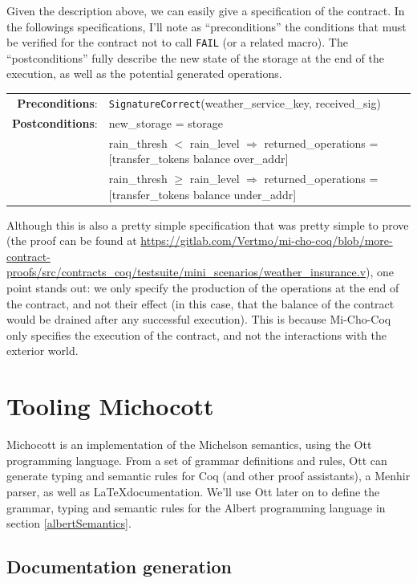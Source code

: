 \documentclass{report}
\begin{document}
Given the description above, we can easily give a specification of the contract. In the followings specifications, I'll note as ``preconditions'' the conditions that must be verified for the contract not to call \lstinline{FAIL} (or a related macro). The ``postconditions'' fully describe the new state of the storage at the end of the execution, as well as the potential generated operations.

{\small
\begin{longtable}{rl}
  \textbf{Preconditions}: & \texttt{SignatureCorrect}(weather\_service\_key, received\_sig)\\
  \textbf{Postconditions}: & new\_storage = storage\\
  & rain\_thresh $<$ rain\_level $\Rightarrow$ returned\_operations = [transfer\_tokens balance over\_addr]\\
  & rain\_thresh $\ge$ rain\_level $\Rightarrow$ returned\_operations = [transfer\_tokens balance under\_addr]\\
\end{longtable}}

Although this is also a pretty simple specification that was pretty simple to prove (the proof can be found at \url{https://gitlab.com/Vertmo/mi-cho-coq/blob/more-contract-proofs/src/contracts_coq/testsuite/mini_scenarios/weather_insurance.v}), one point stands out: we only specify the production of the operations at the end of the contract, and not their effect (in this case, that the balance of the contract would be drained after any successful execution). This is because Mi-Cho-Coq only specifies the execution of the contract, and not the interactions with the exterior world.

\section{Tooling Michocott}

Michocott is an implementation of the Michelson semantics, using the Ott~\cite{ottLang} programming language. From a set of grammar definitions and rules, Ott can generate typing and semantic rules for Coq (and other proof assistants), a Menhir parser, as well as \LaTeX documentation. We'll use Ott later on to define the grammar, typing and semantic rules for the Albert programming language in section \ref{albertSemantics}.

\subsection{Documentation generation}
\end{document}
